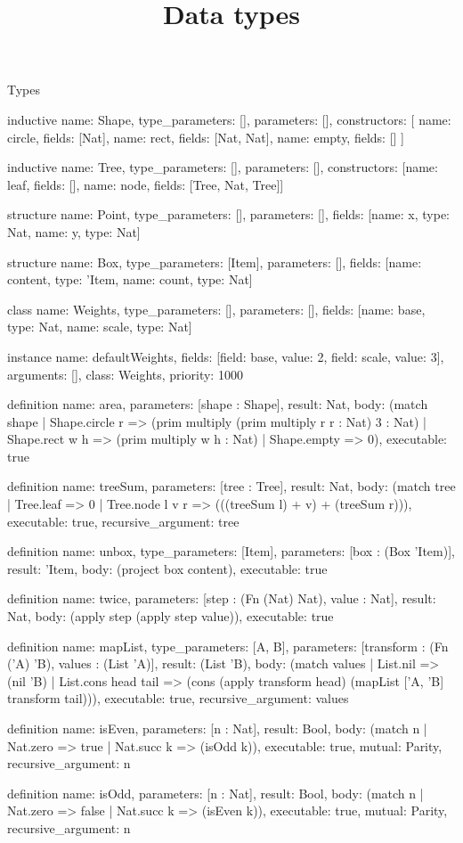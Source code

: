 \begin{lexlean}{Types}
\title{Data types}
\begin{semanticmodule}
inductive{
  name: Shape,
  type_parameters: [],
  parameters: [],
  constructors: [
    {name: circle, fields: [Nat]},
    {name: rect, fields: [Nat, Nat]},
    {name: empty, fields: []}
  ]
}

inductive{
  name: Tree,
  type_parameters: [],
  parameters: [],
  constructors: [{name: leaf, fields: []}, {name: node, fields: [Tree, Nat, Tree]}]
}

structure{
  name: Point,
  type_parameters: [],
  parameters: [],
  fields: [{name: x, type: Nat}, {name: y, type: Nat}]
}

structure{
  name: Box,
  type_parameters: [Item],
  parameters: [],
  fields: [{name: content, type: 'Item}, {name: count, type: Nat}]
}

class{
  name: Weights,
  type_parameters: [],
  parameters: [],
  fields: [{name: base, type: Nat}, {name: scale, type: Nat}]
}

instance{
  name: defaultWeights,
  fields: [{field: base, value: 2}, {field: scale, value: 3}],
  arguments: [],
  class: Weights,
  priority: 1000
}

definition{
  name: area,
  parameters: [shape : Shape],
  result: Nat,
  body: (match shape
    | Shape.circle r => (prim multiply (prim multiply r r : Nat) 3 : Nat)
    | Shape.rect w h => (prim multiply w h : Nat)
    | Shape.empty => 0),
  executable: true
}

definition{
  name: treeSum,
  parameters: [tree : Tree],
  result: Nat,
  body: (match tree | Tree.leaf => 0 | Tree.node l v r => (((treeSum l) + v) + (treeSum r))),
  executable: true,
  recursive_argument: tree
}

definition{
  name: unbox,
  type_parameters: [Item],
  parameters: [box : (Box 'Item)],
  result: 'Item,
  body: (project box content),
  executable: true
}

definition{
  name: twice,
  parameters: [step : (Fn (Nat) Nat), value : Nat],
  result: Nat,
  body: (apply step (apply step value)),
  executable: true
}

definition{
  name: mapList,
  type_parameters: [A, B],
  parameters: [transform : (Fn ('A) 'B), values : (List 'A)],
  result: (List 'B),
  body: (match values
    | List.nil => (nil 'B)
    | List.cons head tail => (cons (apply transform head) (mapList ['A, 'B] transform tail))),
  executable: true,
  recursive_argument: values
}

definition{
  name: isEven,
  parameters: [n : Nat],
  result: Bool,
  body: (match n | Nat.zero => true | Nat.succ k => (isOdd k)),
  executable: true,
  mutual: Parity,
  recursive_argument: n
}

definition{
  name: isOdd,
  parameters: [n : Nat],
  result: Bool,
  body: (match n | Nat.zero => false | Nat.succ k => (isEven k)),
  executable: true,
  mutual: Parity,
  recursive_argument: n
}
\end{semanticmodule}
\end{lexlean}
